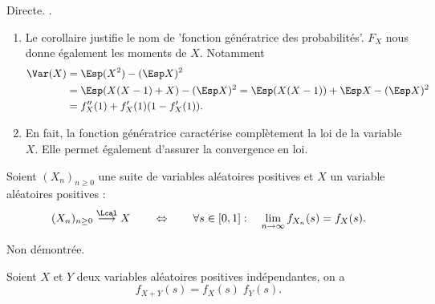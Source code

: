 \proof 
Directe.
\eproof.

\remarks
\begin{enumerate}
  \item Le corollaire justifie le nom de 'fonction génératrice des probabilités'. $F_X$ nous donne également les moments de $X$. Notamment
  \begin{align*}
    \Var(X) 
    & = \Esp(X^2) - (\Esp X)^2 \\
    & = \Esp(X(X-1) + X) - (\Esp X)^2
    = \Esp(X(X-1)) + \Esp X - (\Esp X)^2 \\
    & = f''_X(1) + f'_X(1)(1 - f'_X(1)). 
  \end{align*}
  \item En fait, la fonction génératrice caractérise complètement la loi de la variable $X$. Elle permet également d'assurer la convergence en loi.
\end{enumerate}


\begin{proposition}
  Soient $(X_n)_{n \geq 0}$ une suite de variables aléatoires positives et $X$ un variable aléatoires positives :
  $$
  (X_n)_{n \geq 0} \overset{\Lcal}{\longrightarrow} X
  \qquad \Leftrightarrow \qquad
  \forall s \in [0, 1]: \quad \lim_{n \to \infty} f_{X_n}(s) = f_X(s).
  $$
\end{proposition}

\proof Non démontrée. \eproof

\begin{proposition}
  Soient $X$ et $Y$ deux variables aléatoires positives indépendantes, on a
  $$
  f_{X+Y}(s) = f_X(s) \; f_Y(s).
  $$
\end{proposition}

